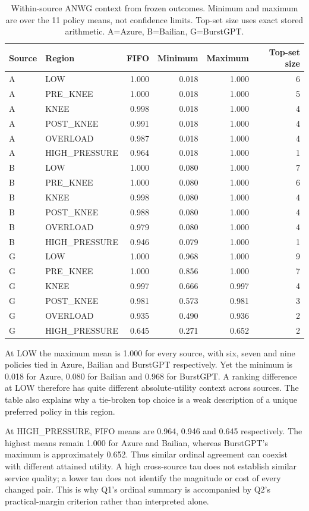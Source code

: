 \begin{table}[t]\centering
\caption{Within-source ANWG context from frozen outcomes. Minimum and maximum
are over the 11 policy means, not confidence limits. Top-set size uses exact
stored arithmetic. A=Azure, B=Bailian, G=BurstGPT.}
\label{tab:within-values}
\begin{tabular}{llrrrr}\toprule
Source & Region & FIFO & Minimum & Maximum & Top-set size\\\midrule
A & LOW & 1.000 & 0.018 & 1.000 & 6\\
A & PRE\_KNEE & 1.000 & 0.018 & 1.000 & 5\\
A & KNEE & 0.998 & 0.018 & 1.000 & 4\\
A & POST\_KNEE & 0.991 & 0.018 & 1.000 & 4\\
A & OVERLOAD & 0.987 & 0.018 & 1.000 & 4\\
A & HIGH\_PRESSURE & 0.964 & 0.018 & 1.000 & 1\\
B & LOW & 1.000 & 0.080 & 1.000 & 7\\
B & PRE\_KNEE & 1.000 & 0.080 & 1.000 & 6\\
B & KNEE & 0.998 & 0.080 & 1.000 & 4\\
B & POST\_KNEE & 0.988 & 0.080 & 1.000 & 4\\
B & OVERLOAD & 0.979 & 0.080 & 1.000 & 4\\
B & HIGH\_PRESSURE & 0.946 & 0.079 & 1.000 & 1\\
G & LOW & 1.000 & 0.968 & 1.000 & 9\\
G & PRE\_KNEE & 1.000 & 0.856 & 1.000 & 7\\
G & KNEE & 0.997 & 0.666 & 0.997 & 4\\
G & POST\_KNEE & 0.981 & 0.573 & 0.981 & 3\\
G & OVERLOAD & 0.935 & 0.490 & 0.936 & 2\\
G & HIGH\_PRESSURE & 0.645 & 0.271 & 0.652 & 2\\
\bottomrule\end{tabular}\end{table}
At LOW the maximum mean is 1.000 for every source, with six, seven and
nine policies tied in Azure, Bailian and BurstGPT respectively. Yet the
minimum is 0.018 for Azure, 0.080 for Bailian and 0.968 for BurstGPT.
A ranking difference at LOW therefore has quite different absolute-utility
context across sources. The table also explains why a tie-broken top
choice is a weak description of a unique preferred policy in this region.

At HIGH\_PRESSURE, FIFO means are 0.964, 0.946 and 0.645 respectively.
The highest means remain 1.000 for Azure and Bailian, whereas BurstGPT's
maximum is approximately 0.652. Thus similar ordinal agreement can coexist
with different attained utility. A high cross-source tau does not establish
similar service quality; a lower tau does not identify the magnitude or
cost of every changed pair. This is why Q1's ordinal summary is accompanied
by Q2's practical-margin criterion rather than interpreted alone.

